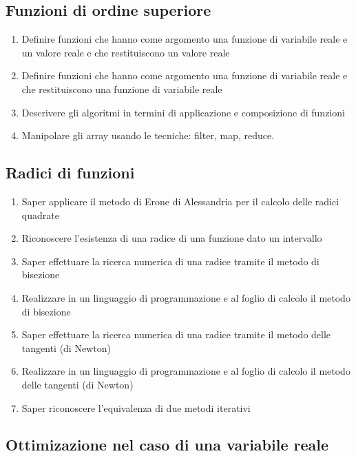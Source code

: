 \documentclass[a4paper]{easychair}
\begin{document}
\subsection[Funzioni di ordine superiore]{Funzioni di ordine superiore}

\begin{enumerate}
  \item
    Definire funzioni che hanno come argomento una funzione di variabile
    reale e un valore reale e che restituiscono un valore reale
  \item
    Definire funzioni che hanno come argomento una funzione di variabile
    reale e che restituiscono una funzione di variabile reale
  \item
    Descrivere gli algoritmi in termini di applicazione e composizione di funzioni
  \item
    Manipolare gli array usando le tecniche: filter, map, reduce.
\end{enumerate}

\subsection[Radici]{Radici di funzioni}

\begin{enumerate}
  \item Saper applicare il metodo di Erone di Alessandria per il calcolo delle radici quadrate
  \item
    Riconoscere l'esistenza di una radice di una funzione dato un intervallo
  \item
    Saper effettuare la ricerca numerica di una radice tramite il metodo
    di bisezione
  \item
    Realizzare in un linguaggio di programmazione e al foglio di calcolo
    il metodo di bisezione
    \item
    Saper effettuare la ricerca numerica di una radice tramite il metodo
    delle tangenti (di Newton)
  \item
    Realizzare in un linguaggio di programmazione e al foglio di calcolo
    il metodo delle tangenti (di Newton)
  \item
    Saper riconoscere l'equivalenza di due metodi iterativi
\end{enumerate}

\subsection[Ottimizzazione]{Ottimizazione nel caso di una variabile reale}
\end{document}
